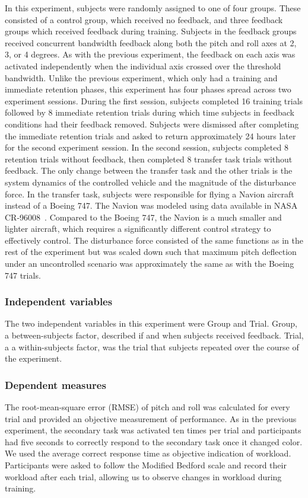 In this experiment, subjects were randomly assigned to one of four groups.
These consisted of a control group, which received no feedback, and three feedback groups which received feedback during training.
Subjects in the feedback groups received concurrent bandwidth feedback along both the pitch and roll axes at 2, 3, or 4 degrees.
As with the previous experiment, the feedback on each axis was activated independently when the individual axis crossed over the threshold bandwidth.
Unlike the previous experiment, which only had a training and immediate retention phases, this experiment has four phases spread across two experiment sessions.
During the first session, subjects completed 16 training trials followed by 8 immediate retention trials during which time subjects in feedback conditions had their feedback removed.
Subjects were dismissed after completing the immediate retention trials and asked to return approximately 24 hours later for the second experiment session.
In the second session, subjects completed 8 retention trials without feedback, then completed 8 transfer task trials without feedback.
The only change between the transfer task and the other trials is the system dynamics of the controlled vehicle and the magnitude of the disturbance force.
In the transfer task, subjects were responsible for flying a Navion aircraft instead of a Boeing 747.
The Navion was modeled using data available in NASA CR-96008~\citep{teper1969aircraft}.
Compared to the Boeing 747, the Navion is a much smaller and lighter aircraft, which requires a significantly different control strategy to effectively control.
The disturbance force consisted of the same functions as in the rest of the experiment but was scaled down such that maximum pitch deflection under an uncontrolled scenario was approximately the same as with the Boeing 747 trials.

\subsubsection{Independent variables}
The two independent variables in this experiment were Group and Trial.
Group, a between-subjects factor, described if and when subjects received feedback.
Trial, a a within-subjects factor, was the trial that subjects repeated over the course of the experiment.

\subsubsection{Dependent measures}
The root-mean-square error (RMSE) of pitch and roll was calculated for every trial and provided an objective measurement of performance.
As in the previous experiment, the secondary task was activated ten times per trial and participants had five seconds to correctly respond to the secondary task once it changed color.
We used the average correct response time as objective indication of workload.
Participants were asked to follow the Modified Bedford scale and record their workload after each trial, allowing us to observe changes in workload during training.


